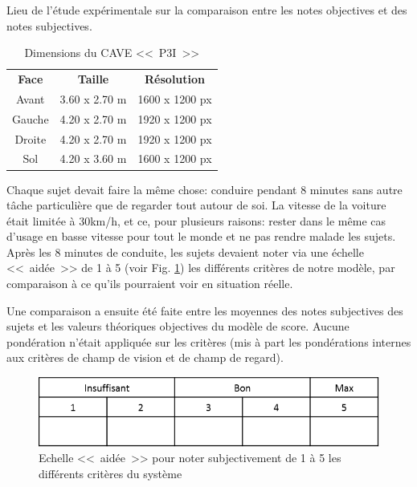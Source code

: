 	\begin{table}[h]
		\centering
		\caption{Dimensions du CAVE <<~P3I~>>}{Lieu de l'étude expérimentale sur la comparaison entre les notes objectives et des notes subjectives.}
		\label{tab:cave_dimensions}
		\small
		\begin{tabular}{ccc}
			\multicolumn{1}{c}{\bfseries Face} & \multicolumn{1}{c}{\bfseries Taille} & \multicolumn{1}{c}{\bfseries Résolution}\\
			Avant & 3.60 x 2.70 m & 1600 x 1200 px\\
			Gauche & 4.20 x 2.70 m & 1920 x 1200 px\\
			Droite & 4.20 x 2.70 m & 1920 x 1200 px\\
			Sol & 4.20 x 3.60 m & 1600 x 1200 px\\
		\end{tabular}
	\end{table}
	 
	 \par Chaque sujet devait faire la même chose: conduire pendant 8 minutes sans autre tâche particulière que de regarder tout autour de soi. La vitesse de la voiture était limitée à 30km/h, et ce, pour plusieurs raisons: rester dans le même cas d'usage en basse vitesse pour tout le monde et ne pas rendre malade les sujets. Après les 8 minutes de conduite, les sujets devaient noter via une échelle <<~aidée~>> de 1 à 5 (voir Fig. \ref{fig:aided_scale}) les différents critères de notre modèle, par comparaison à ce qu'ils pourraient voir en situation réelle.
	 
	 \par Une comparaison a ensuite été faite entre les moyennes des notes subjectives des sujets et les valeurs théoriques objectives du modèle de score. Aucune pondération n'était appliquée sur les critères (mis à part les pondérations internes aux critères de champ de vision et de champ de regard).
	
	\begin{figure}[h]
		\centering
		\includegraphics[scale=1]{Figures/AidedScale}
		\caption{Echelle <<~aidée~>> pour noter subjectivement de 1 à 5 les différents critères du système}
		\label{fig:aided_scale}
	\end{figure}
	
